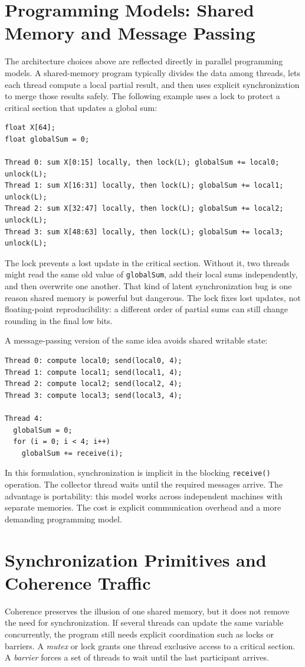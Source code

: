 \section{Programming Models: Shared Memory and Message Passing}\label{sec:mp-programming-models}
The architecture choices above are reflected directly in parallel programming models.
A shared-memory program typically divides the data among threads, lets each thread compute a local partial result, and then uses explicit synchronization to merge those results safely.
The following example uses a lock to protect a critical section that updates a global sum:
\begin{verbatim}
float X[64];
float globalSum = 0;

Thread 0: sum X[0:15] locally, then lock(L); globalSum += local0; unlock(L);
Thread 1: sum X[16:31] locally, then lock(L); globalSum += local1; unlock(L);
Thread 2: sum X[32:47] locally, then lock(L); globalSum += local2; unlock(L);
Thread 3: sum X[48:63] locally, then lock(L); globalSum += local3; unlock(L);
\end{verbatim}
The lock prevents a lost update in the critical section.
Without it, two threads might read the same old value of \texttt{globalSum}, add their local sums independently, and then overwrite one another.
That kind of latent synchronization bug is one reason shared memory is powerful but dangerous.
The lock fixes lost updates, not floating-point reproducibility: a different order of partial sums can still change rounding in the final low bits.

A message-passing version of the same idea avoids shared writable state:
\begin{verbatim}
Thread 0: compute local0; send(local0, 4);
Thread 1: compute local1; send(local1, 4);
Thread 2: compute local2; send(local2, 4);
Thread 3: compute local3; send(local3, 4);

Thread 4:
  globalSum = 0;
  for (i = 0; i < 4; i++)
    globalSum += receive(i);
\end{verbatim}
In this formulation, synchronization is implicit in the blocking \texttt{receive()} operation.
The collector thread waits until the required messages arrive.
The advantage is portability: this model works across independent machines with separate memories.
The cost is explicit communication overhead and a more demanding programming model.


\section{Synchronization Primitives and Coherence Traffic}\label{sec:mp-sync}
Coherence preserves the illusion of one shared memory, but it does not remove the need for synchronization.
If several threads can update the same variable concurrently, the program still needs explicit coordination such as locks or barriers.
A \textit{mutex} or lock grants one thread exclusive access to a critical section.
A \textit{barrier} forces a set of threads to wait until the last participant arrives.

